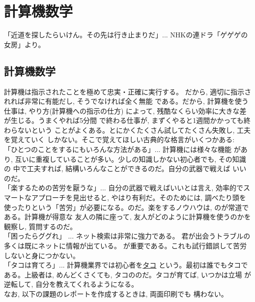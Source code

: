 \chapter{計算機数学}\label{chapt_computer}

{\small 「近道を探したらいけん。その先は行き止まりだ」...
NHKの連ドラ「ゲゲゲの女房」より。\hv}

\section{計算機数学}



計算機は指示されたことを極めて忠実・正確に実行する。
だから, 適切に指示されれば非常に有能だし, そうでなければ全く無能
である。だから, 計算機を使う仕事は, やり方(計算機への指示の仕方)
によって, 残酷なくらい効率に大きな差が生じる。うまくやれば5分間
で終わる仕事が, まずくやると1週間かかっても終わらないという
ことがよくある。とにかくたくさん試してたくさん失敗し, 工夫を覚えていく
しかない。そこで覚えてほしい古典的な格言がいくつかある:\\

「ひとつのことをするにもいろんな方法がある」... 計算機には様々な機能
があり, 互いに重複していることが多い。少しの知識しかない初心者でも, その知識の
中で工夫すれば, 結構いろんなことができるのだ。自分の武器で戦えば
いいのだ。\\

「楽するための苦労を厭うな」... 自分の武器で戦えばいいとは言え, 
効率的でスマートなアプローチを見出せると, やはり有利だ。そのためには, 
調べたり頭を使ったりという「苦労」が必要になる。のだ。楽をするノウハウは, 
のが常道である。計算機が得意な
友人の隣に座って, 友人がどのように計算機を使うのかを観察し, 
質問するのだ。\\

「困ったらググれ」 ... ネット検索は非常に強力である。
君が出会うトラブルの多くは既にネットに情報が出ている。
が重要である。これも試行錯誤して苦労しないと身につかない。\\

「タコは育てろ」... 計算機業界では初心者を\underline{タコ} 
という。最初は誰でもタコである。上級者は, めんどくさくても, 
タコののだ。タコが育てば, いつかは立場
が逆転して, 自分を教えてくれるようになる。\\

なお, 以下の課題のレポートを作成するときは, 両面印刷でも
構わない。\\








